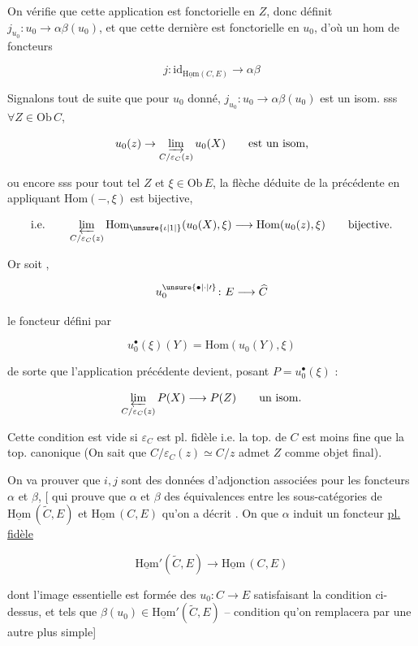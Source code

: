 On vérifie que cette application est fonctorielle en $Z$, donc définit $j_{u_0}\colon u_0\longrightarrow\alpha\beta(u_0)$, et que cette dernière est fonctorielle en $u_0$, d'où un hom de foncteurs

\[
\boxed{j\colon\mathrm{id}_{\underline{\mathrm{Hom}}(C,E)}\longrightarrow\alpha\beta}
\]

Signalons tout de suite que pour  $u_0$ donné, $j_{u_0}\colon u_0\longrightarrow\alpha\beta(u_0)$ est un isom. sss  $\forall Z\in\mathrm{Ob}\,C$,

\[
u_0(z)\to\varinjlim_{C/\varepsilon_C(z)}u_0(X)\qquad\text{est un isom,}
\]

ou encore sss pour tout tel $Z$ et $\xi\in\mathrm{Ob}\,E$, la flèche déduite de la précédente en appliquant $\mathrm{Hom}(-,\xi)$ est bijective,

\[
\text{i.e.}\qquad\varprojlim_{C/\varepsilon_C(z)}\mathrm{Hom}_{\unsure{\iota|1|{}}}(u_0(X),\xi)\longrightarrow\mathrm{Hom}(u_0(z),\xi)\qquad\text{bijective.}
\]

Or soit ,

\[
u_0^{\unsure{\bullet|\cdot|\prime}}\colon E\longrightarrow\widehat C
\]

le foncteur défini par

\[
u_0^\bullet(\xi)(Y)=\mathrm{Hom}(u_0(Y),\xi)
\]

de sorte que l'application précédente devient, posant $P=u_0^\bullet(\xi)$ :

\[
\varprojlim_{C/\varepsilon_C(z)}P(X)\longrightarrow P(Z)\qquad\text{un isom.}
\]

 Cette condition est vide si $\varepsilon_C$ est pl. fidèle i.e. la top. de $C$ est moins fine que la top. canonique (On sait que $C/\varepsilon_C(z)\simeq C/z$ admet $Z$ comme objet final).

On va prouver que $i,j$ sont des données d'adjonction associées pour les foncteurs $\alpha$ et $\beta$, [ qui prouve que $\alpha$ et $\beta$   des équivalences entre les sous-catégories  de $\underline{\mathrm{Hom}}\,(\widetilde C,E)$ et $\underline{\mathrm{Hom}}\,(C,E)$ qu'on a décrit . On    que $\alpha$ induit un foncteur \uline{pl. fidèle}

\[
\underline{\mathrm{Hom}}'(\widetilde C,E)\longrightarrow\underline{\mathrm{Hom}}\,(C,E)
\]

dont l'image essentielle est formée des  $u_0\colon C\longrightarrow E$ satisfaisant la condition ci-dessus, et tels que $\beta(u_0)\in\underline{\mathrm{Hom}}'(\widetilde C,E)$ -- condition qu'on remplacera par une autre plus simple]

